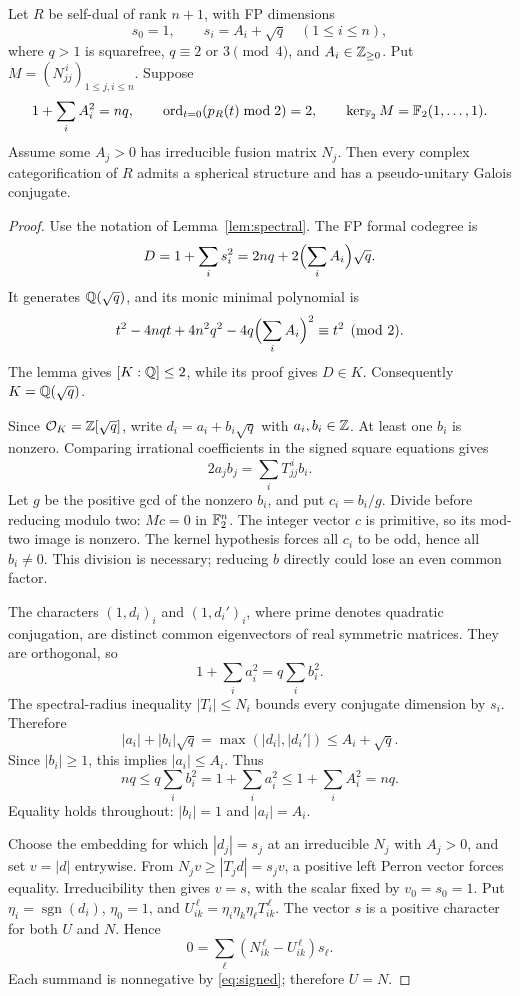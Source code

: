\begin{theorem}\label{thm:parity}
Let $R$ be self-dual of rank $n+1$, with FP dimensions
\[
 s_0=1,\qquad s_i=A_i+\sqrt q\quad(1\le i\le n),
\]
where $q>1$ is squarefree, $q\equiv2$ or $3\pmod4$, and
$A_i\in\mathbb Z_{\ge0}$. Put $M=(N_{jj}^{\,i})_{1\le j,i\le n}$.
Suppose
\begin{equation}\label{eq:parity-hypotheses}
 1+\sum_i A_i^2=nq,\qquad
 \operatorname{ord}_{t=0}(p_R(t)\bmod2)=2,\qquad
 \ker_{\mathbb F_2}M=\mathbb F_2(1,\ldots,1).
\end{equation}
Assume some $A_j>0$ has irreducible fusion matrix $N_j$.
Then every complex categorification of $R$ admits a spherical structure
and has a pseudo-unitary Galois conjugate.
\end{theorem}
\begin{proof}
Use the notation of Lemma~\ref{lem:spectral}. The FP formal codegree is
\[
 D=1+\sum_i s_i^2=2nq+2\Bigl(\sum_iA_i\Bigr)\sqrt q.
\]
It generates $\mathbb Q(\sqrt q)$, and its monic minimal polynomial is
\[
 t^2-4nqt+4n^2q^2-4q\Bigl(\sum_i A_i\Bigr)^2\equiv t^2\pmod2.
\]
The lemma gives $[K:\mathbb Q]\le2$, while its proof gives $D\in K$.
Consequently $K=\mathbb Q(\sqrt q)$.

Since $\mathcal O_K=\mathbb Z[\sqrt q]$, write $d_i=a_i+b_i\sqrt q$ with
$a_i,b_i\in\mathbb Z$. At least one $b_i$ is nonzero. Comparing irrational
coefficients in the signed square equations gives
\[
 2a_jb_j=\sum_iT_{jj}^{\,i}b_i.
\]
Let $g$ be the positive gcd of the nonzero $b_i$, and put $c_i=b_i/g$.
Divide before reducing modulo two: $Mc=0$ in $\mathbb F_2^n$.
The integer vector $c$ is primitive, so its mod-two image is nonzero.
The kernel hypothesis forces all $c_i$ to be odd, hence all $b_i\ne0$.
This division is necessary; reducing $b$ directly could lose an even
common factor.

The characters $(1,d_i)_i$ and $(1,d_i')_i$, where prime denotes quadratic
conjugation, are distinct common eigenvectors of real symmetric matrices.
They are orthogonal, so
\begin{equation}\label{eq:orthogonality}
 1+\sum_i a_i^2=q\sum_i b_i^2.
\end{equation}
The spectral-radius inequality $|T_i|\le N_i$ bounds every conjugate
dimension by $s_i$. Therefore
\[
 |a_i|+|b_i|\sqrt q=\max(|d_i|,|d_i'|)\le A_i+\sqrt q.
\]
Since $|b_i|\ge1$, this implies $|a_i|\le A_i$. Thus
\[
 nq\le q\sum_i b_i^2=1+\sum_i a_i^2
       \le1+\sum_i A_i^2=nq.
\]
Equality holds throughout: $|b_i|=1$ and $|a_i|=A_i$.

Choose the embedding for which $|d_j|=s_j$ at an irreducible $N_j$ with
$A_j>0$, and set $v=|d|$ entrywise. From
$N_jv\ge|T_jd|=s_jv$, a positive left Perron vector forces equality.
Irreducibility then gives $v=s$, with the scalar fixed by $v_0=s_0=1$.
Put $\eta_i=\operatorname{sgn}(d_i)$, $\eta_0=1$, and
$U_{ik}^{\,\ell}=\eta_i\eta_k\eta_\ell T_{ik}^{\,\ell}$.
The vector $s$ is a positive character for both $U$ and $N$. Hence
\[
 0=\sum_\ell(N_{ik}^{\,\ell}-U_{ik}^{\,\ell})s_\ell.
\]
Each summand is nonnegative by \eqref{eq:signed}; therefore $U=N$.


\end{proof}
